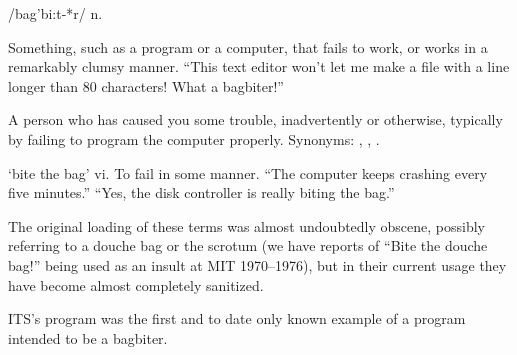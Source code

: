  /bag'bi:t-*r/ n.

\begin{inparaenum}
	\item Something, such as a program or a computer, that fails to work, or
		works in a remarkably clumsy manner. ``This text editor won't let me
		make a file with a line longer than 80 characters! What a bagbiter!''
	\item A person who has caused you some trouble, inadvertently or otherwise,
		typically by failing to program the computer properly. Synonyms:
		, , .
	\item `bite the bag' vi. To fail in some manner. ``The computer keeps
		crashing every five minutes.'' ``Yes, the disk controller is really
		biting the bag.''
\end{inparaenum}

The original loading of these terms was almost undoubtedly obscene, possibly
referring to a douche bag or the scrotum (we have reports of ``Bite the douche
bag!'' being used as an insult at MIT 1970--1976), but in their current usage
they have become almost completely sanitized.

ITS's  program was the first and to date only known example
of a program intended to be a bagbiter.

